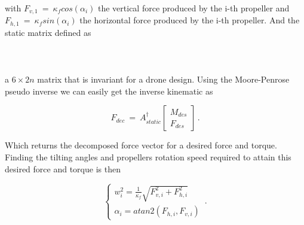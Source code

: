 with $F_{v,1}\ = \ \kappa_f cos(\alpha_i)$ the vertical force produced by the i-th
propeller and $F_{h,1}\ = \ \kappa_f sin(\alpha_i)$ the horizontal force produced
by the i-th propeller. And the static matrix defined as\\\\
\\\\
a $6 \times 2n$ matrix that is invariant for a drone design. Using the Moore-Penrose
pseudo inverse we can easily get the inverse kinematic as

\begin{equation}
  \label{inverse_kin}
  F_{dec}  \ = \ A_{static}^{\dagger}
    \begin{bmatrix}
      M_{des} \\
      F_{des}
    \end{bmatrix}
    \, .
\end{equation}

Which returns the decomposed force vector for a desired force and torque. Finding
the tilting angles and propellers rotation speed required to attain this desired
force and torque is then

\begin{equation}
  \label{decomposition}
  \begin{cases}
    w_i^2 = \frac{1}{\kappa_f} \sqrt{F_{v,i}^2 + F_{h,i}^2} \\
    \alpha_i = atan2(F_{h,i},F_{v,i})
  \end{cases}\, .
\end{equation}

